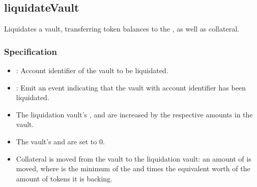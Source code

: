 \documentclass[a4paper,10pt,english]{sphinxmanual}
\begin{document}
\subsection{liquidateVault}
\label{\detokenize{spec/vault-registry:liquidatevault}}\label{\detokenize{spec/vault-registry:id37}}
Liquidates a vault, transferring token balances to the , as well as collateral.


\subsubsection{Specification}
\label{\detokenize{spec/vault-registry:id38}}


\begin{itemize}
\item {} 
: Account identifier of the vault to be liquidated.

\end{itemize}

\begin{itemize}
\item {} 
: Emit an event indicating that the vault with  account identifier has been liquidated.

\end{itemize}


\begin{itemize}
\item {} 
The liquidation vault’s ,  and  are increased by the respective amounts in the vault.

\item {} 
The vault’s  and  are set to 0.

\item {} 
Collateral is moved from the vault to the liquidation vault: an amount of  is moved, where  is the minimum of the  and  times the equivalent worth of the amount of tokens it is backing.

\end{itemize}
\end{document}
